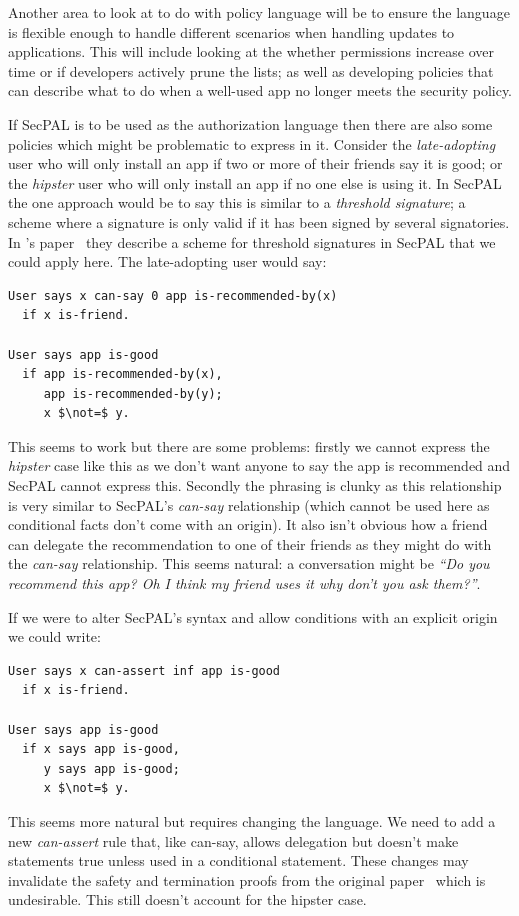 \documentclass[a4paper,sfsidenotes]{%
  scrartcl%
}
\begin{document}
Another area to look at to do with policy language will be to ensure the language
is flexible enough to handle different scenarios when handling updates to
applications.  This will include looking at the whether permissions increase
over time or if developers actively prune the lists; as well as developing
policies that can describe what to do when a well-used app no longer meets the
security policy.  

\label{secpal:problems}

If SecPAL is to be used as the authorization language then there are also some
policies which might be problematic to express in it.  Consider the
\emph{late-adopting} user who will only install an app if two or more of their
friends say it is good; or the \emph{hipster} user who will only install an app
if no one else is using it. In SecPAL the one approach would be to say this is
similar to a \emph{threshold signature}; a scheme where a signature is only
valid if it has been signed by several signatories.  In
\citeauthor*{Becker:2006vh}'s paper~\cite{Becker:2006vh} they describe a scheme
for threshold signatures in SecPAL that we could apply here.  The late-adopting user would
say: 

\begin{lstlisting}[language=SecPAL, mathescape=true] 
User says x can-say 0 app is-recommended-by(x)
  if x is-friend.

User says app is-good
  if app is-recommended-by(x),
     app is-recommended-by(y);
     x $\not=$ y.
\end{lstlisting}
This seems to work but there are some problems: firstly we cannot express the
\emph{hipster} case like this as we don't want anyone to say the app is
recommended and SecPAL cannot express this.  Secondly the phrasing is clunky as
this relationship is very similar to SecPAL's \emph{can-say} relationship (which
cannot be used here as conditional facts don't come with an origin).  It also
isn't obvious how a friend can delegate the recommendation to one of their
friends as they might do with the \emph{can-say} relationship. This seems
natural: a conversation might be \emph{``Do you recommend this app? Oh I think
my friend uses it why don't you ask them?''}.  

If we were to alter SecPAL's syntax and allow conditions with an explicit origin
we could write:
\begin{lstlisting}[language=SecPAL, mathescape=true]
User says x can-assert inf app is-good
  if x is-friend.

User says app is-good
  if x says app is-good,
     y says app is-good;
     x $\not=$ y.
\end{lstlisting}
This seems more natural but requires changing the language. We need to add a new
\emph{can-assert} rule that, like can-say, allows delegation but doesn't make
statements true unless used in a conditional statement.  These changes may
invalidate the safety and termination proofs from the original
paper~\cite{Becker:2006vh} which is undesirable.  This still doesn't account for
the hipster case. 
\end{document}
